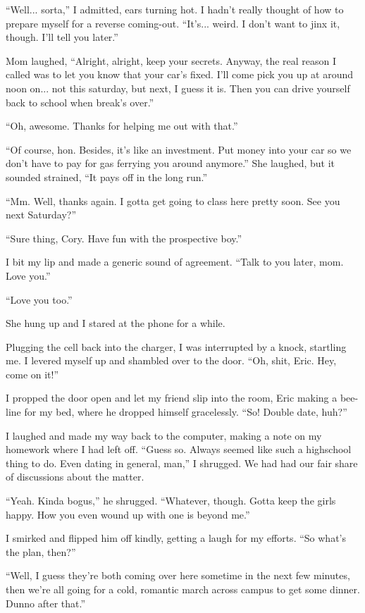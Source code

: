 ``Well... sorta,'' I admitted, ears turning hot.  I hadn't really thought of how to prepare myself for a reverse coming-out.  ``It's... weird.  I don't want to jinx it, though.  I'll tell you later.''

Mom laughed, ``Alright, alright, keep your secrets.  Anyway, the real reason I called was to let you know that your car's fixed.  I'll come pick you up at around noon on... not this saturday, but next, I guess it is.  Then you can drive yourself back to school when break's over.''

``Oh, awesome.  Thanks for helping me out with that.''

``Of course, hon.  Besides, it's like an investment.  Put money into your car so we don't have to pay for gas ferrying you around anymore.''  She laughed, but it sounded strained, ``It pays off in the long run.''

``Mm.  Well, thanks again.  I gotta get going to class here pretty soon.  See you next Saturday?''

``Sure thing, Cory.  Have fun with the prospective boy.''

I bit my lip and made a generic sound of agreement.  ``Talk to you later, mom.  Love you.''

``Love you too.''

She hung up and I stared at the phone for a while.

Plugging the cell back into the charger, I was interrupted by a knock, startling me.  I levered myself up and shambled over to the door.  ``Oh, shit, Eric.  Hey, come on it!''

I propped the door open and let my friend slip into the room, Eric making a bee-line for my bed, where he dropped himself gracelessly.  ``So!  Double date, huh?''

I laughed and made my way back to the computer, making a note on my homework where I had left off.  ``Guess so.  Always seemed like such a highschool thing to do.  Even dating in general, man,'' I shrugged.  We had had our fair share of discussions about the matter.

``Yeah.  Kinda bogus,'' he shrugged.  ``Whatever, though.  Gotta keep the girls happy.  How you even wound up with one is beyond me.''

I smirked and flipped him off kindly, getting a laugh for my efforts.  ``So what's the plan, then?''

``Well, I guess they're both coming over here sometime in the next few minutes, then we're all going for a cold, romantic march across campus to get some dinner.  Dunno after that.''

